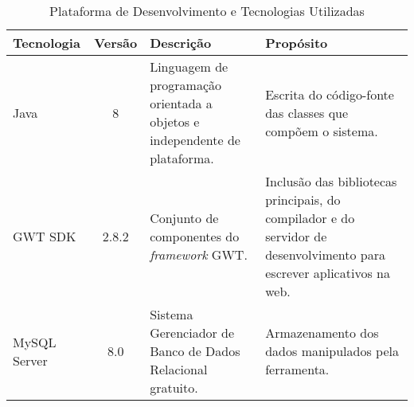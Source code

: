 \begin{table}[h]
	\centering	
	\vspace{0.5cm}
	\footnotesize
	\caption{Plataforma de Desenvolvimento e Tecnologias Utilizadas}	
	\label{tabela-plataforma}
	\begin{tabular}{|p{1.6cm}|c|p{5cm}|p{6.5cm}|}  \hline 
 		Tecnologia & Versão & Descrição & Propósito \\\hline 
 		

		Java & 8 & Linguagem de programação orientada a objetos e independente de plataforma. & Escrita do código-fonte das classes que compõem o sistema. \\\hline
		
		
		
		
		
		GWT SDK & 2.8.2 &  Conjunto de componentes do \textit{framework} GWT. & Inclusão das bibliotecas principais, do compilador e do servidor de desenvolvimento para escrever aplicativos na web. \\\hline
		
		MySQL Server & 8.0 & Sistema Gerenciador de Banco de Dados Relacional gratuito. & Armazenamento dos dados manipulados pela ferramenta. \\\hline
		

\end{tabular}
\end{table}
